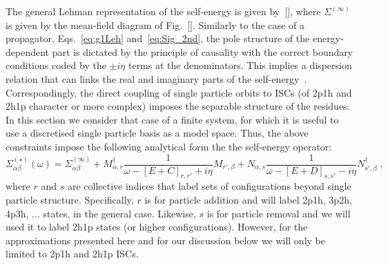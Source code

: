 The general Lehman representation of the self-energy is given by~\eqref{}, where $\Sigma^{(\infty)}$  is given by the mean-field diagram of Fig.~\ref{}. Similarly to the case of a propagator, Eqs.~\eqref{eq:g1Leh} and~\eqref{eq:Sig_2nd}, the  pole structure of the energy-dependent part is dictated by the principle of causality with the correct boundary conditions coded by the  $\pm i\eta$ terms at the denominators.  This implies a dispersion relation that  can links the real and imaginary parts of the self-energy~\cite{Dickhoff2008}.  Correspondingly, the direct coupling of single particle orbits to  ISCs (of 2p1h and 2h1p character or more complex) imposes  the separable structure of the residues. In this section we consider that case of a  finite system, for which it is useful to use a discretised single particle basis as a model space. Thus, the above constraints impose the following  analytical form the the self-energy operator:
\begin{equation}
\Sigma^{(\star)}_{\alpha\beta}(\omega) = \Sigma^{(\infty)}_{\alpha\beta} +M^\dagger_{\alpha,r}\frac1{\omega - [E +C]_{r,r'} + i \eta}M_{r',\beta} 
       +N_{\alpha,s}\frac1{\omega - [E +D]_{s,s'} - i \eta}N^\dagger_{s',\beta}  \; ,
\label{eq:ADC_SE_form}
\end{equation}
where $r$ and $s$ are collective indices that label sets of configurations beyond single particle structure. Specifically, $r$ is for particle addition and will label 2p1h, 3p2h, 4p3h, ... states, in the general case. Likewise, $s$ is for particle removal and we will used it to label 2h1p states (or higher configurations). However, for the approximations presented here and for our discussion below we will only be limited to 2p1h and 2h1p ISCs.

